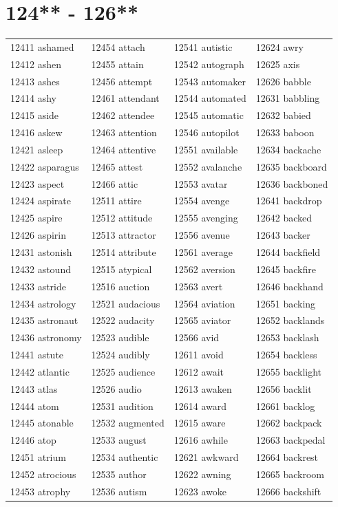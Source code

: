 \documentclass[10pt, oneside]{book}
\begin{document}
\begin{table}
	\centering
	\section*{124** - 126**}
	\begin{tabular}{l l l l}
12411 ashamed &12454 attach &12541 autistic &12624 awry\\
12412 ashen &12455 attain &12542 autograph &12625 axis\\
12413 ashes &12456 attempt &12543 automaker &12626 babble\\
12414 ashy &12461 attendant &12544 automated &12631 babbling\\
12415 aside &12462 attendee &12545 automatic &12632 babied\\
12416 askew &12463 attention &12546 autopilot &12633 baboon\\
12421 asleep &12464 attentive &12551 available &12634 backache\\
12422 asparagus &12465 attest &12552 avalanche &12635 backboard\\
12423 aspect &12466 attic &12553 avatar &12636 backboned\\
12424 aspirate &12511 attire &12554 avenge &12641 backdrop\\
12425 aspire &12512 attitude &12555 avenging &12642 backed\\
12426 aspirin &12513 attractor &12556 avenue &12643 backer\\
12431 astonish &12514 attribute &12561 average &12644 backfield\\
12432 astound &12515 atypical &12562 aversion &12645 backfire\\
12433 astride &12516 auction &12563 avert &12646 backhand\\
12434 astrology &12521 audacious &12564 aviation &12651 backing\\
12435 astronaut &12522 audacity &12565 aviator &12652 backlands\\
12436 astronomy &12523 audible &12566 avid &12653 backlash\\
12441 astute &12524 audibly &12611 avoid &12654 backless\\
12442 atlantic &12525 audience &12612 await &12655 backlight\\
12443 atlas &12526 audio &12613 awaken &12656 backlit\\
12444 atom &12531 audition &12614 award &12661 backlog\\
12445 atonable &12532 augmented &12615 aware &12662 backpack\\
12446 atop &12533 august &12616 awhile &12663 backpedal\\
12451 atrium &12534 authentic &12621 awkward &12664 backrest\\
12452 atrocious &12535 author &12622 awning &12665 backroom\\
12453 atrophy &12536 autism &12623 awoke &12666 backshift\\
	\end{tabular}
 \end{table}
\clearpage
\end{document}
